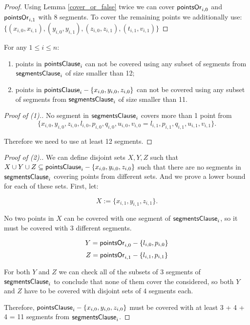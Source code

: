 \begin{proof}
Using Lemma \ref{cover_or_false} twice we can
cover $\mathsf{pointsOr}_{i,0}$ and  $\mathsf{pointsOr}_{i,1}$
with 8 segments.
To cover the remaining points we additionally use:
$\{ (x_{i, 0}, x_{i, 1}), (y_{i, 0}, y_{i, 1}),
(z_{i, 0}, z_{i, 1}), (t_{i, 1}, v_{i, 1}) \}$
\end{proof}

\begin{lemma}
\label{cover_clauses_segments_no_less}
For any $1 \le i \le n$:
\begin{enumerate}[label={(\arabic*)}]
	\item points in $\mathsf{pointsClause}_i$ can not be covered 
	using any subset of segments
	from $\mathsf{segmentsClause}_i$ of size smaller than 12;
	\item points in $\mathsf{pointsClause}_i - \{ x_{i, 0}, y_{i, 0}, z_{i, 0}\}$
	can not be covered using any subset of segments
	from $\mathsf{segmentsClause}_i$ of size smaller than 11.
\end{enumerate}
\end{lemma}


\begin{proof}[Proof of (1).]
No segment in $\mathsf{segmentsClause}_i$ covers more than 1 point from
$$\{ x_{i, 0}, y_{i, 0}, z_{i, 0}, l_{i, 0}, p_{i, 0}, q_{i, 0},
u_{i, 0}, v_{i, 0} = l_{i, 1}, p_{i, 1}, q_{i, 1}, u_{i, 1}, v_{i, 1} \}.$$

Therefore we need to use at least 12 segments.
\end{proof}

\begin{proof}[Proof of (2).]

We can define disjoint sets $X, Y, Z$ such that
$X \cup Y \cup Z \subseteq \mathsf{pointsClause}_i - \{x_{i, 0}, y_{i, 0}, z_{i, 0}\}$
such that there are no segments in $\mathsf{segmentsClause}_i$ covering points from different sets.
And we prove a lower bound for each of these sets.
First, let:

$$X := \{x_{i, 1}, y_{i, 1}, z_{i, 1}\}.$$

No two points in $X$ can be covered with one segment
of $\mathsf{segmentsClause}_i$, so it must be covered with 3 different segments.

$$Y = \mathsf{pointsOr}_{i,0} - \{l_{i, 0}, p_{i, 0}\}$$
$$Z = \mathsf{pointsOr}_{i,1} - \{l_{i, 1}, p_{i, 1}\}$$


For both $Y$ and $Z$ we can check all of the subsets of 3 segments
of $\mathsf{segmentsClause}_i$
to conclude that none of them cover the considered,
so both $Y$ and $Z$ have to be covered with 
disjoint sets of 4 segments each.

Therefore, $\mathsf{pointsClause}_i - \{x_{i, 0}, y_{i, 0}, z_{i, 0}\}$
must be covered with at least 3 + 4 + 4 = 11 segments from $\mathsf{segmentsClause}_i$.
\end{proof}

